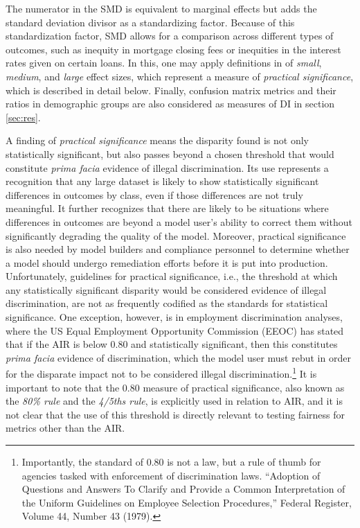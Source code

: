 \documentclass[information,article,submit,moreauthors,pdftex]{definitions/mdpi}
\begin{document}
\noindent The numerator in the SMD is equivalent to marginal effects but adds the standard deviation divisor as a standardizing factor.  Because of this standardization factor, SMD allows for a comparison across different types of outcomes, such as inequity in mortgage closing fees or inequities in the interest rates given on certain loans.  In this, one may apply definitions in \citet{cohen1988statistical} of \textit{small}, \textit{medium}, and \textit{large} effect sizes, which represent a measure of \textit{practical significance}, which is described in detail below.  Finally, confusion matrix metrics and their ratios in demographic groups are also considered as measures of DI in section \ref{sec:res}.

A finding of \textit{practical significance} means the disparity found is not only statistically significant, but also passes beyond a chosen threshold that would constitute \textit{prima facia} evidence of illegal discrimination.  Its use represents a recognition that any large dataset is likely to show statistically significant differences in outcomes by class, even if those differences are not truly meaningful.  It further recognizes that there are likely to be situations where differences in outcomes are beyond a model user’s ability to correct them without significantly degrading the quality of the model. Moreover, practical significance is also needed by model builders and compliance personnel to determine whether a model should undergo remediation efforts before it is put into production. Unfortunately, guidelines for practical significance, i.e., the threshold at which any statistically significant disparity would be considered evidence of illegal discrimination, are not as frequently codified as the standards for statistical significance.  One exception, however, is in employment discrimination analyses, where the US Equal Employment Opportunity Commission (EEOC) has stated that if the AIR is below 0.80 and statistically significant, then this constitutes \textit{prima facia} evidence of discrimination, which the model user must rebut in order for the disparate impact not to be considered illegal discrimination.\footnote{Importantly, the standard of 0.80 is not a law, but a rule of thumb for agencies tasked with enforcement of discrimination laws.  ``Adoption of Questions and Answers To Clarify and Provide a Common Interpretation of the Uniform Guidelines on Employee Selection Procedures,'' Federal Register, Volume 44, Number 43 (1979).} It is important to note that the 0.80 measure of practical significance, also known as the \textit{80\% rule} and the \textit{4/5ths rule}, is explicitly used in relation to AIR, and it is not clear that the use of this threshold is directly relevant to testing fairness for metrics other than the AIR.
\end{document}
